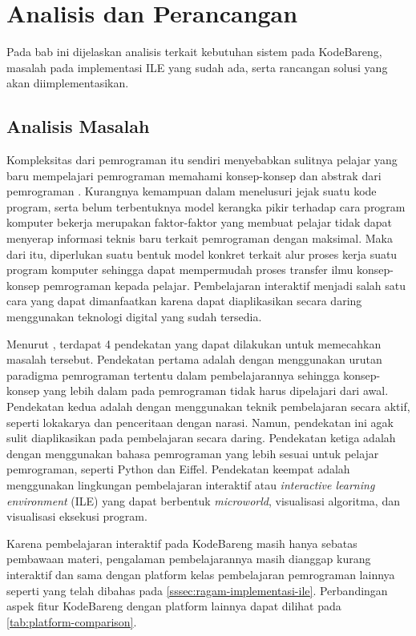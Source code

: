 \chapter{Analisis dan Perancangan}
Pada bab ini dijelaskan analisis terkait kebutuhan sistem pada KodeBareng, masalah pada implementasi ILE yang sudah ada, serta rancangan solusi yang akan diimplementasikan.

\section{Analisis Masalah}

Kompleksitas dari pemrograman itu sendiri menyebabkan sulitnya pelajar yang baru mempelajari pemrograman memahami konsep-konsep dan abstrak dari pemrograman \parencite{moons2013pilot}. Kurangnya kemampuan dalam menelusuri jejak suatu kode program, serta belum terbentuknya model kerangka pikir terhadap cara program komputer bekerja \parencite{mayer1981psychology} merupakan faktor-faktor yang membuat pelajar tidak dapat menyerap informasi teknis baru terkait pemrograman dengan maksimal. Maka dari itu, diperlukan suatu bentuk model konkret terkait alur proses kerja suatu program komputer sehingga dapat mempermudah proses transfer ilmu konsep-konsep pemrograman kepada pelajar. Pembelajaran interaktif menjadi salah satu cara yang dapat dimanfaatkan karena dapat diaplikasikan secara daring menggunakan teknologi digital yang sudah tersedia.

Menurut \textcite{moons2013pilot}, terdapat 4 pendekatan yang dapat dilakukan untuk memecahkan masalah tersebut. Pendekatan pertama adalah dengan menggunakan urutan paradigma pemrograman tertentu dalam pembelajarannya sehingga konsep-konsep yang lebih dalam pada pemrograman tidak harus dipelajari dari awal. Pendekatan kedua adalah dengan menggunakan teknik pembelajaran secara aktif, seperti lokakarya dan penceritaan dengan narasi. Namun, pendekatan ini agak sulit diaplikasikan pada pembelajaran secara daring. Pendekatan ketiga adalah dengan menggunakan bahasa pemrograman yang lebih sesuai untuk pelajar pemrograman, seperti Python dan Eiffel. Pendekatan keempat adalah menggunakan lingkungan pembelajaran interaktif atau \textit{interactive learning environment} (ILE) yang dapat berbentuk \textit{microworld}, visualisasi algoritma, dan visualisasi eksekusi program.

Karena pembelajaran interaktif pada KodeBareng masih hanya sebatas pembawaan materi, pengalaman pembelajarannya masih dianggap kurang interaktif dan sama dengan platform kelas pembelajaran pemrograman lainnya seperti yang telah dibahas pada \autoref{sssec:ragam-implementasi-ile}. Perbandingan aspek fitur KodeBareng dengan platform lainnya dapat dilihat pada \autoref{tab:platform-comparison}.

